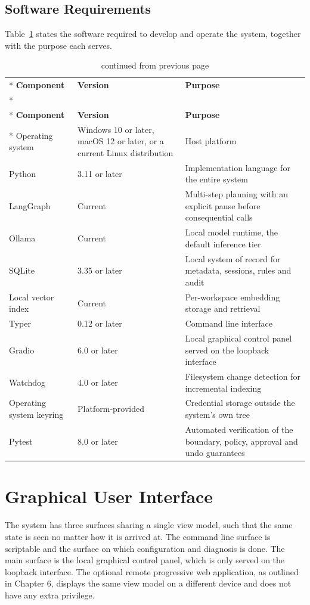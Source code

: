 \documentclass{FastFyp}
\begin{document}
\subsection{Software Requirements}
Table~\ref{tab:software} states the software required to develop and operate the system, together with the purpose each serves.

{
\begin{longtable}{|p{3.6cm}|p{3.0cm}|p{6.2cm}|}
\caption{Software requirements.}\label{tab:software}\\*
\hline
\textbf{Component} & \textbf{Version} & \textbf{Purpose} \\*
\hline
\endfirsthead
\caption[]{continued from previous page}\\*
\hline
\textbf{Component} & \textbf{Version} & \textbf{Purpose} \\*
\hline
\endhead
\hline
Operating system & Windows 10 or later, macOS 12 or later, or a current Linux distribution & Host platform \\
\hline
Python & 3.11 or later & Implementation language for the entire system \\
\hline
LangGraph \cite{ref:langgraph} & Current & Multi-step planning with an explicit pause before consequential calls \\
\hline
Ollama \cite{ref:ollama} & Current & Local model runtime, the default inference tier \\
\hline
SQLite \cite{ref:sqlite} & 3.35 or later & Local system of record for metadata, sessions, rules and audit \\
\hline
Local vector index & Current & Per-workspace embedding storage and retrieval \\
\hline
Typer & 0.12 or later & Command line interface \\
\hline
Gradio & 6.0 or later & Local graphical control panel served on the loopback interface \\
\hline
Watchdog & 4.0 or later & Filesystem change detection for incremental indexing \\
\hline
Operating system keyring & Platform-provided & Credential storage outside the system's own tree \\
\hline
Pytest & 8.0 or later & Automated verification of the boundary, policy, approval and undo guarantees \\
\hline
\end{longtable}
}

\section{Graphical User Interface}
The system has three surfaces sharing a single view model, such that the same state is seen no matter how it is arrived at. The command line surface is scriptable and the surface on which configuration and diagnosis is done. The main surface is the local graphical control panel, which is only served on the loopback interface. The optional remote progressive web application, as outlined in Chapter 6, displays the same view model on a different device and does not have any extra privilege.
\end{document}
